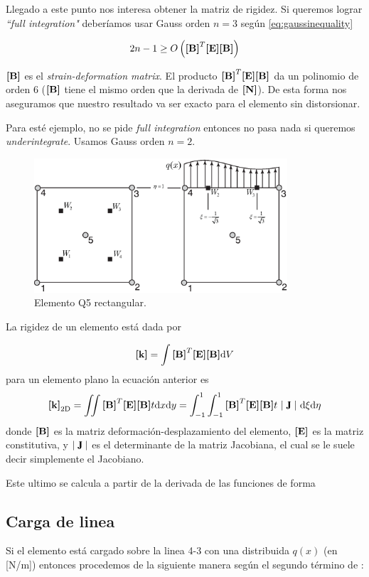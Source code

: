 Llegado a este punto nos interesa obtener la matriz de rigidez. Si queremos lograr \emph{``full integration"} deberíamos usar Gauss orden $n=3$ según \eqref{eq:gaussinequality}

\begin{equation} \label{eq:gaussinequality}
2n-1\geq O\left(\boldsymbol{[}\mathbf{B} \boldsymbol{]}^T \boldsymbol{[}\mathbf{E} \boldsymbol{]} \boldsymbol{[}\mathbf{B} \boldsymbol{]} \right)
\end{equation}


$\boldsymbol{[}\mathbf{B} \boldsymbol{]}$ es el \textit{strain-deformation matrix}. El producto $\boldsymbol{[}\mathbf{B} \boldsymbol{]}^T \boldsymbol{[}\mathbf{E} \boldsymbol{]} \boldsymbol{[}\mathbf{B} \boldsymbol{]}$ da un polinomio de orden 6 ($\boldsymbol{[}\mathbf{B} \boldsymbol{]}$ tiene el mismo orden que la derivada de $\boldsymbol{[}\mathbf{N} \boldsymbol{]}$). De esta forma nos aseguramos que nuestro resultado va ser exacto para el elemento sin distorsionar.

Para esté ejemplo, no se pide \emph{full integration} entonces no pasa nada si queremos \emph{underintegrate}. Usamos Gauss orden $n=2$. 

\begin{figure}[htb!]
	\centering
	\includegraphics[height=5cm]{fig/exoticElement.eps}
	\caption{Elemento Q5 rectangular.}
	\label{fig:elemq5}
\end{figure}

La rigidez de un elemento está dada por 


\begin{equation} \label{eq:RigidezElemento}
\boldsymbol{[}\mathbf{k} \boldsymbol{]}=\int \boldsymbol{[}\mathbf{B} \boldsymbol{]}^T \boldsymbol{[}\mathbf{E} \boldsymbol{]} \boldsymbol{[}\mathbf{B} \boldsymbol{]} \textrm{d} V
\end{equation}
para un elemento plano la ecuación anterior es
\[
\Mk_{\mathrm{2D}}=\iint \MB^T \ME \MB t \di x \di y=\int^1_{-1}\int^1_{-1} \MB^T \ME \MB t \ \Djac \  \di\xi  \di\eta
\]
donde $\boldsymbol{[}\mathbf{B} \boldsymbol{]}$ es la matriz deformación-desplazamiento del elemento, $\boldsymbol{[}\mathbf{E} \boldsymbol{]}$ es la matriz constitutiva, y $\Djac$ es el determinante de la matriz Jacobiana, el cual se le suele decir simplemente el Jacobiano.

Este ultimo se calcula a partir de la derivada de las funciones de forma $ $

\subsection*{Carga de linea}
Si el elemento está cargado sobre la linea 4-3 con una distribuida $q(x)$ (en [N/m]) entonces procedemos de la siguiente manera según el segundo término de : 

